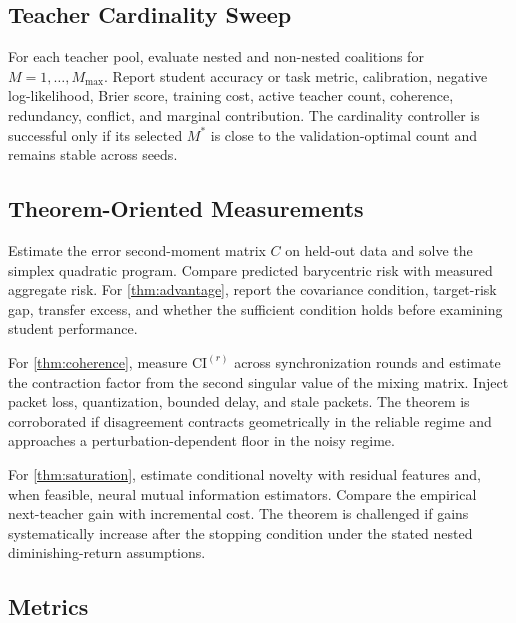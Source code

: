 \documentclass[10pt,twocolumn,a4paper]{article}
\begin{document}
\subsection{Teacher Cardinality Sweep}

For each teacher pool, evaluate nested and non-nested coalitions for \(M=1,\ldots,M_{\max}\). Report student accuracy or task metric, calibration, negative log-likelihood, Brier score, training cost, active teacher count, coherence, redundancy, conflict, and marginal contribution. The cardinality controller is successful only if its selected \(M^*\) is close to the validation-optimal count and remains stable across seeds.

\subsection{Theorem-Oriented Measurements}

Estimate the error second-moment matrix \(C\) on held-out data and solve the simplex quadratic program. Compare predicted barycentric risk with measured aggregate risk. For \cref{thm:advantage}, report the covariance condition, target-risk gap, transfer excess, and whether the sufficient condition holds before examining student performance.

For \cref{thm:coherence}, measure \(\mathrm{CI}^{(r)}\) across synchronization rounds and estimate the contraction factor from the second singular value of the mixing matrix. Inject packet loss, quantization, bounded delay, and stale packets. The theorem is corroborated if disagreement contracts geometrically in the reliable regime and approaches a perturbation-dependent floor in the noisy regime.

For \cref{thm:saturation}, estimate conditional novelty with residual features and, when feasible, neural mutual information estimators. Compare the empirical next-teacher gain with incremental cost. The theorem is challenged if gains systematically increase after the stopping condition under the stated nested diminishing-return assumptions.

\subsection{Metrics}
\end{document}
